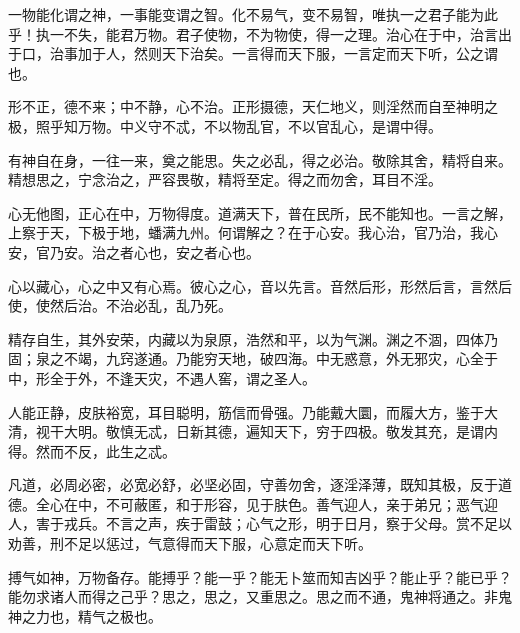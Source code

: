 一物能化谓之神，一事能变谓之智。化不易气，变不易智，唯执一之君子能为此乎！执一不失，能君万物。君子使物，不为物使，得一之理。治心在于中，治言出于口，治事加于人，然则天下治矣。一言得而天下服，一言定而天下听，公之谓也。

形不正，德不来；中不静，心不治。正形摄德，天仁地义，则淫然而自至神明之极，照乎知万物。中义守不忒，不以物乱官，不以官乱心，是谓中得。

有神自在身，一往一来，奠之能思。失之必乱，得之必治。敬除其舍，精将自来。精想思之，宁念治之，严容畏敬，精将至定。得之而勿舍，耳目不淫。

心无他图，正心在中，万物得度。道满天下，普在民所，民不能知也。一言之解，上察于天，下极于地，蟠满九州。何谓解之？在于心安。我心治，官乃治，我心安，官乃安。治之者心也，安之者心也。

心以藏心，心之中又有心焉。彼心之心，音以先言。音然后形，形然后言，言然后使，使然后治。不治必乱，乱乃死。

精存自生，其外安荣，内藏以为泉原，浩然和平，以为气渊。渊之不涸，四体乃固；泉之不竭，九窍遂通。乃能穷天地，破四海。中无惑意，外无邪灾，心全于中，形全于外，不逢天灾，不遇人窖，谓之圣人。

人能正静，皮肤裕宽，耳目聪明，筋信而骨强。乃能戴大圜，而履大方，鉴于大清，视干大明。敬慎无忒，日新其德，遍知天下，穷于四极。敬发其充，是谓内得。然而不反，此生之忒。

凡道，必周必密，必宽必舒，必坚必固，守善勿舍，逐淫泽薄，既知其极，反于道德。全心在中，不可蔽匿，和于形容，见于肤色。善气迎人，亲于弟兄；恶气迎人，害于戎兵。不言之声，疾于雷鼓；心气之形，明于日月，察于父母。赏不足以劝善，刑不足以惩过，气意得而天下服，心意定而天下听。

搏气如神，万物备存。能搏乎？能一乎？能无卜筮而知吉凶乎？能止乎？能已乎？能勿求诸人而得之己乎？思之，思之，又重思之。思之而不通，鬼神将通之。非鬼神之力也，精气之极也。
